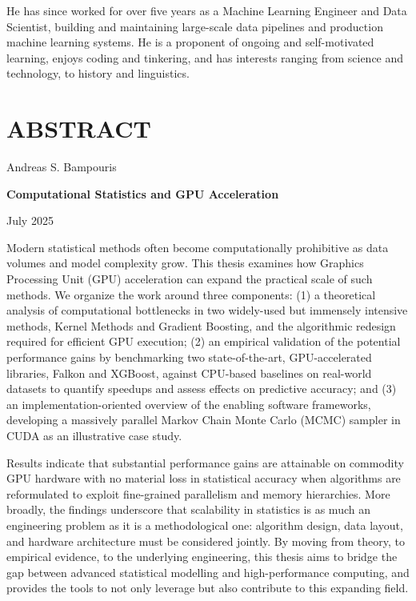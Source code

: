 He has since worked for over five years as a Machine Learning Engineer and Data Scientist, building and maintaining large-scale data pipelines and production machine learning systems. He is a proponent of ongoing and self-motivated learning, enjoys coding and tinkering, and has interests ranging from science and technology, to history and linguistics.

\vfill

\newpage

\chapter*{ABSTRACT}

\vspace*{0.5cm}

\noindent Andreas S. Bampouris

\vspace{0.5cm}

\noindent\textbf{Computational Statistics and GPU Acceleration}

\vspace{0.25cm}

\noindent\hfill July 2025

\vspace{1cm}

Modern statistical methods often become computationally prohibitive as data volumes and model complexity grow. This thesis examines how Graphics Processing Unit (GPU) acceleration can expand the practical scale of such methods. We organize the work around three components: (1) a theoretical analysis of computational bottlenecks in two widely-used but immensely intensive methods, Kernel Methods and Gradient Boosting, and the algorithmic redesign required for efficient GPU execution; (2) an empirical validation of the potential performance gains by benchmarking two state-of-the-art, GPU-accelerated libraries, Falkon and XGBoost, against CPU-based baselines on real-world datasets to quantify speedups and assess effects on predictive accuracy; and (3) an implementation-oriented overview of the enabling software frameworks, developing a massively parallel Markov Chain Monte Carlo (MCMC) sampler in CUDA as an illustrative case study.

Results indicate that substantial performance gains are attainable on commodity GPU hardware with no material loss in statistical accuracy when algorithms are reformulated to exploit fine-grained parallelism and memory hierarchies. More broadly, the findings underscore that scalability in statistics is as much an engineering problem as it is a methodological one: algorithm design, data layout, and hardware architecture must be considered jointly. By moving from theory, to empirical evidence, to the underlying engineering, this thesis aims to bridge the gap between advanced statistical modelling and high-performance computing, and provides the tools to not only leverage but also contribute to this expanding field.

